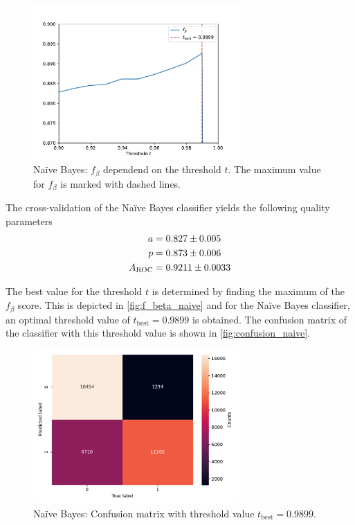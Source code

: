 \begin{figure}
    \centering
    \includegraphics[width=0.7\textwidth]{content/plots/f_beta_naive.pdf}
    \caption{Na\"ive Bayes: $f_{\beta}$ dependend on the threshold $t$. The maximum value for $f_{\beta}$ is marked with dashed lines.}
    \label{fig:f_beta_naive}
\end{figure}
The cross-validation of the Na\"ive Bayes classifier yields the following quality parameters
\begin{align*}
    a &= \num{0.827 \pm 0.005} \\
    p &= \num{0.873 \pm 0.006} \\
    A_{\mathrm{ROC}} &= \num{0.9211 \pm 0.0033}
\end{align*}

The best value for the threshold $t$ is determined by finding the maximum of the $f_{\beta}$ score. This is depicted in \autoref{fig:f_beta_naive} and for the
Na\"ive Bayes classifier, an optimal threshold value of $t_{\mathrm{best}} = \num{0.9899}$ is obtained.
The confusion matrix of the classifier with this threshold value is shown in \autoref{fig:confusion_naive}.
\begin{figure}
    \centering
    \includegraphics[width=0.7\textwidth]{content/plots/confusion_naive.pdf}
    \caption{Na\"ive Bayes: Confusion matrix with threshold value $t_{\mathrm{best}} = \num{0.9899}$.}
    \label{fig:confusion_naive}
\end{figure}

